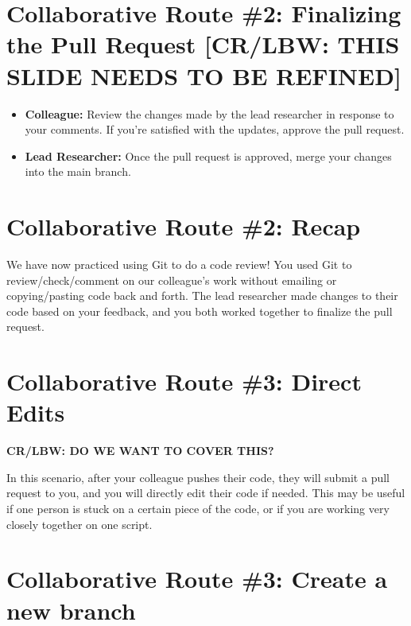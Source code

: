 \documentclass[
]{book}
\providecommand{\tightlist}{%
  \setlength{\itemsep}{0pt}\setlength{\parskip}{0pt}}
\begin{document}
\hypertarget{collaborative-route-2-finalizing-the-pull-request-crlbw-this-slide-needs-to-be-refined}{%
\section{Collaborative Route \#2: Finalizing the Pull Request {[}CR/LBW: THIS SLIDE NEEDS TO BE REFINED{]}}\label{collaborative-route-2-finalizing-the-pull-request-crlbw-this-slide-needs-to-be-refined}}

\begin{itemize}
\tightlist
\item
  \textbf{Colleague:} Review the changes made by the lead researcher in response to your comments. If you're satisfied with the updates, approve the pull request.
\item
  \textbf{Lead Researcher:} Once the pull request is approved, merge your changes into the main branch.
\end{itemize}

\hypertarget{collaborative-route-2-recap}{%
\section{Collaborative Route \#2: Recap}\label{collaborative-route-2-recap}}

We have now practiced using Git to do a code review! You used Git to review/check/comment on our colleague's work without emailing or copying/pasting code back and forth. The lead researcher made changes to their code based on your feedback, and you both worked together to finalize the pull request.

\hypertarget{collaborative-route-3-direct-edits}{%
\section{Collaborative Route \#3: Direct Edits}\label{collaborative-route-3-direct-edits}}

\textbf{CR/LBW: DO WE WANT TO COVER THIS?}

In this scenario, after your colleague pushes their code, they will submit a pull request to you, and you will directly edit their code if needed. This may be useful if one person is stuck on a certain piece of the code, or if you are working very closely together on one script.

\hypertarget{collaborative-route-3-create-a-new-branch}{%
\section{Collaborative Route \#3: Create a new branch}\label{collaborative-route-3-create-a-new-branch}}
\end{document}
